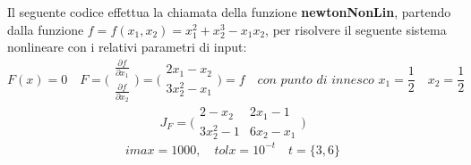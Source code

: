 Il seguente codice effettua la chiamata della funzione \textbf{newtonNonLin}, partendo dalla funzione $f = f(x_1,x_2)=x_1^2+x_2^3-x_1x_2$, per risolvere il seguente sistema nonlineare con i relativi parametri di input:
	\[
	F(x)=0 \quad
	F=\Bigg(\begin{matrix}
		\frac{\partial f}{\partial x_1} \\
		\frac{\partial f}{\partial x_2} 
	\end{matrix}\Bigg) = 
	\Bigg(\begin{matrix}
		2x_1-x_2 \\
		3x_2^2-x_1
	\end{matrix}\Bigg)=f \quad
	\textit{con punto di innesco } x_1=\frac{1}{2} \quad x_2=\frac{1}{2}
	\]
	\[
	J_F=\Bigg(\begin{matrix}
		2-x_2 & 2x_1-1 \\
		3x_2^2-1 & 6x_2-x_1 
	\end{matrix}\Bigg)
	\]
	\[
	imax=1000, \quad 
	tolx=10^{-t} \quad t=\{3,6\}
	\]

